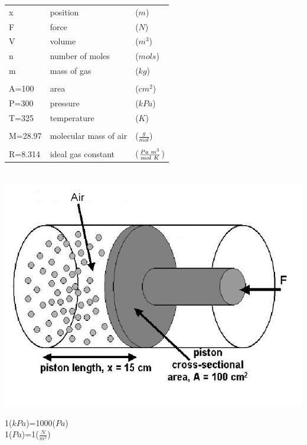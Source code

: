 \documentclass[11pt]{article}
\begin{document}
\begin{description}
            \begin{multicols}{2}
            
            \begin{tabular}{lll}
            x &position &($m$)   \\
            F &force    &($N$)   \\
            V &volume   &($m^3$) \\        
            n &number of moles &($mols$) \\   
            m & mass of gas&($kg$)      \\ 
            \\
            A=100 &area     &($cm^2$)  \\
            P=300 &pressure &($kPa$) \\ 
            T=325 & temperature &($K$) \\\\ 
            M=28.97 & molecular mass of air &($\frac{g}{mol}$)       \\\\ 
            R=8.314 & ideal gas constant &($\frac{Pa\hspace{1mm}m^3}{mol\hspace{1mm}K}$)\\ 
            \end{tabular}\\
            

            
            \includegraphics[scale=.35]{lab2_fig1.png} \\    
            \end{multicols}
               1($kPa$)=1000($Pa$)\\
               1($Pa$)=1($\frac{N}{m^2}$)
\newpage



\end{description}
\end{document}
